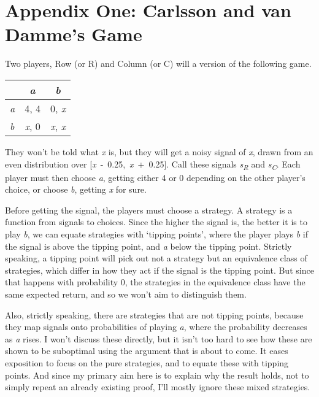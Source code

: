 \documentclass[
  11pt,
  letterpaper,
  DIV=11,
  numbers=noendperiod,
  twoside]{scrartcl}
\begin{document}
\section*{Appendix One: Carlsson and van Damme's
Game}\label{appendixone:carlssonandvandammesgame}

Two players, Row (or R) and Column (or C) will a version of the
following game.

\begin{longtable}[]{@{}lcc@{}}
\toprule\noalign{}
& \emph{a} & \emph{b} \\
\midrule\noalign{}
\endhead
\bottomrule\noalign{}
\endlastfoot
\emph{a} & 4, 4 & 0, \emph{x} \\
\emph{b} & \emph{x}, 0 & \emph{x}, \emph{x} \\
\end{longtable}

They won't be told what \emph{x} is, but they will get a noisy signal of
\emph{x}, drawn from an even distribution over
{[}\emph{x}~-~0.25,~\emph{x}~+~0.25{]}. Call these signals
\emph{s\textsubscript{R}} and \emph{s\textsubscript{C}}. Each player
must then choose \emph{a}, getting either 4 or 0 depending on the other
player's choice, or choose \emph{b}, getting \emph{x} for sure.

Before getting the signal, the players must choose a strategy. A
strategy is a function from signals to choices. Since the higher the
signal is, the better it is to play \emph{b}, we can equate strategies
with `tipping points', where the player plays \emph{b} if the signal is
above the tipping point, and \emph{a} below the tipping point. Strictly
speaking, a tipping point will pick out not a strategy but an
equivalence class of strategies, which differ in how they act if the
signal is the tipping point. But since that happens with probability 0,
the strategies in the equivalence class have the same expected return,
and so we won't aim to distinguish them.

Also, strictly speaking, there are strategies that are not tipping
points, because they map signals onto probabilities of playing \emph{a},
where the probability decreases as \emph{a} rises. I won't discuss these
directly, but it isn't too hard to see how these are shown to be
suboptimal using the argument that is about to come. It eases exposition
to focus on the pure strategies, and to equate these with tipping
points. And since my primary aim here is to explain why the result
holds, not to simply repeat an already existing proof, I'll mostly
ignore these mixed strategies.
\end{document}
